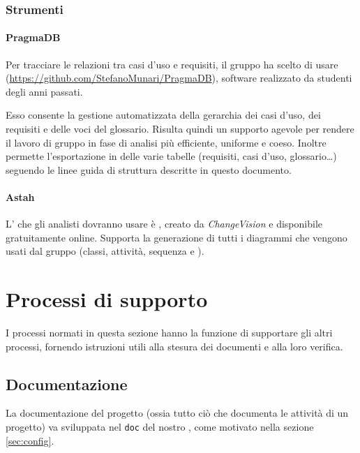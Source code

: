 	\subsubsection{Strumenti}
		\paragraph{PragmaDB}
		Per tracciare le relazioni tra casi d'uso e requisiti, il gruppo ha scelto di usare  (\url{https://github.com/StefanoMunari/PragmaDB}), software realizzato da studenti degli anni passati. %
		
		Esso consente la gestione automatizzata della gerarchia dei casi d'uso, dei requisiti e delle voci del glossario. Risulta quindi un supporto agevole per rendere il lavoro di gruppo in fase di analisi più efficiente, uniforme e coeso. Inoltre permette l'esportazione in  delle varie tabelle (requisiti, casi d'uso, glossario\dots) seguendo le linee guida di struttura descritte in questo documento.
		\paragraph{Astah}
		L'  che gli analisti dovranno usare è , creato da \emph{ChangeVision} e disponibile gratuitamente online. Supporta la generazione di tutti i diagrammi che vengono usati dal gruppo (classi, attività, sequenza e ).



\section{Processi di supporto} \label{sec:supporto}
I processi normati in questa sezione hanno la funzione di supportare gli altri processi, fornendo istruzioni utili alla stesura dei documenti e alla loro verifica.

\subsection{Documentazione} \label{sec:doc}
La documentazione del progetto (ossia tutto ciò che documenta le attività di un progetto) va sviluppata nel  \texttt{doc} del nostro , come motivato nella sezione \ref{sec:config}.

